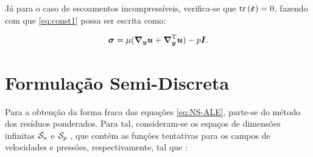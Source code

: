 Já para o caso de escoamentos incompressíveis, verifica-se que $\mathop{\mathrm{tr}}\nolimits{(\dot{\boldsymbol{\varepsilon}})}=0$, fazendo com que \eqref{eq:const1} possa ser escrita como:

\begin{equation}
    \boldsymbol{\sigma}=\mu(\boldsymbol{\nabla_y}\boldsymbol{u}+\boldsymbol{\nabla}^{\mathrm{T}}_{\boldsymbol{y}}\boldsymbol{u})-p\boldsymbol{I}\text{.}\label{eq:ModConst}
\end{equation}

% 
% 

\section{Formulação Semi-Discreta} \label{FSD}

Para a obtenção da forma fraca das equações \eqref{eq:NS-ALE}, parte-se do método dos resíduos ponderados. Para tal, consideram-se os espaços de dimensões infinitas $\mathcal{S}_u$ e $\mathcal{S}_p$ , que contém as funções tentativas para os campos de velocidades e pressões, respectivamente, tal que \cite{bazilevs2013computational,fernandes2020tecnica}:

